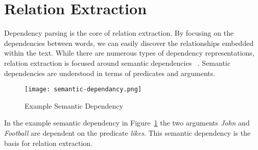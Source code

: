 \documentclass[bsc,frontabs,twoside,singlespacing,parskip,deptreport]{infthesis}     %
\begin{document}
\section{Relation Extraction}\label{sec:IE-bg}
Dependency parsing is the core of relation extraction.
By focusing on the dependencies between words, we can easily discover the relationships embedded within the text.
While there are numerous types of dependency representations, relation extraction is focused around semantic dependencies ~\cite{mcclosky2011event}.
Semantic dependencies are understood in terms of predicates and arguments.
\begin{figure}[H]
  \centering
  \texttt{[image: semantic-dependancy.png]}
  \caption{Example Semantic Dependency}
  \label{fig:semantic-dependancy}
\end{figure}

In the example semantic dependency in Figure~\ref{fig:semantic-dependancy} the two arguments \textit{John} and \textit{Football} are dependent
on the predicate \textit{likes}. This semantic dependency is the basis for relation extraction.
\end{document}
